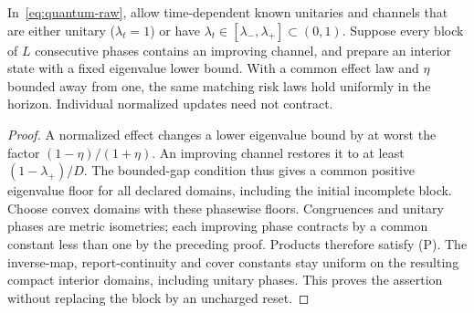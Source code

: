 \begin{corollary}\label{cor:quantum-block}
In~\eqref{eq:quantum-raw}, allow time-dependent known unitaries and channels that are either unitary ($\lambda_t=1$) or have $\lambda_t\in[\lambda_-,\lambda_+]\subset(0,1)$. Suppose every block of $L$ consecutive phases contains an improving channel, and prepare an interior state with a fixed eigenvalue lower bound. With a common effect law and $\eta$ bounded away from one, the same matching risk laws hold uniformly in the horizon. Individual normalized updates need not contract.
\end{corollary}
\begin{proof}
A normalized effect changes a lower eigenvalue bound by at worst the factor $(1-\eta)/(1+\eta)$. An improving channel restores it to at least $(1-\lambda_+)/D$. The bounded-gap condition thus gives a common positive eigenvalue floor for all declared domains, including the initial incomplete block. Choose convex domains with these phasewise floors. Congruences and unitary phases are metric isometries; each improving phase contracts by a common constant less than one by the preceding proof. Products therefore satisfy (P). The inverse-map, report-continuity and cover constants stay uniform on the resulting compact interior domains, including unitary phases. This proves the assertion without replacing the block by an uncharged reset.
\end{proof}
